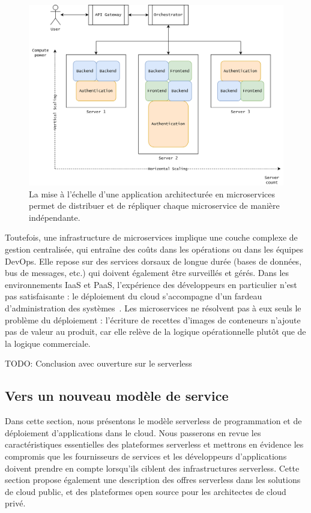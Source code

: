 \begin{figure}[ht]
    \centering
	\includegraphics[width=\textwidth]{2_Chapitre2/figures/scaling-microservices.png}
	\caption{La mise à l'échelle d'une application architecturée en microservices permet de distribuer et de répliquer chaque microservice de manière indépendante.}
	\label{fig:scaling-microservices}
\end{figure}

Toutefois, une infrastructure de microservices implique une couche complexe de gestion centralisée, qui entraîne des coûts dans les opérations ou dans les équipes DevOps. Elle repose sur des services dorsaux de longue durée (bases de données, bus de messages, etc.) qui doivent également être surveillés et gérés. Dans les environnements IaaS et PaaS, l'expérience des développeurs en particulier n'est pas satisfaisante : le déploiement du cloud s'accompagne d'un fardeau d'administration des systèmes~\cite{jonasCloudProgrammingSimplified2019}. Les microservices ne résolvent pas à eux seuls le problème du déploiement : l'écriture de recettes d'images de conteneurs n'ajoute pas de valeur au produit, car elle relève de la logique opérationnelle plutôt que de la logique commerciale.

TODO: Conclusion avec ouverture sur le serverless

\subsection{Vers un nouveau modèle de service}

Dans cette section, nous présentons le modèle serverless de programmation et de déploiement d'applications dans le cloud. Nous passerons en revue les caractéristiques essentielles des plateformes serverless et mettrons en évidence les compromis que les fournisseurs de services et les développeurs d'applications doivent prendre en compte lorsqu'ils ciblent des infrastructures serverless. Cette section propose également une description des offres serverless dans les solutions de cloud public, et des plateformes open source pour les architectes de cloud privé.

